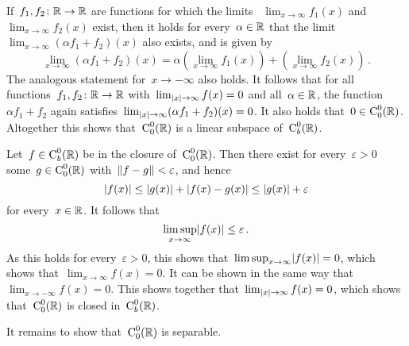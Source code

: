 If~$f_1, f_2 \colon \mathbb{R} \to \mathbb{R}$ are functions for which the limits
~$\lim_{x \to \infty} f_1(x)$ and~$\lim_{x \to \infty} f_2(x)$ exist, then it holds for every~$\alpha \in \mathbb{R}$ that the limit~$\lim_{x \to \infty} (\alpha f_1 + f_2)(x)$ also exists, and is given by
\[
    \lim_{x \to \infty} (\alpha f_1 + f_2)(x)
  =   \alpha \left( \lim_{x \to \infty} f_1(x) \right)
    + \left( \lim_{x \to \infty} f_2(x) \right) \,.
\]
The analogous statement for~$x \to -\infty$ also holds.
It follows that for all functions~$f_1, f_2 \colon \mathbb{R} \to \mathbb{R}$ with~$\lim_{\lvert x\rvert \to \infty} f(x) = 0$ and all~$\alpha \in \mathbb{R}$, the function~$\alpha f_1 + f_2$ again satisfies~$\lim_{\lvert x\rvert \to \infty} (\alpha f_1 + f_2)(x) = 0$.
It also holds that~$0 \in \operatorname{C}^0_0(\mathbb{R})$.
Altogether this shows that~$\operatorname{C}^0_0(\mathbb{R})$ is a linear subspace of~$\operatorname{C}^0_b(\mathbb{R})$.

Let~$f \in \operatorname{C}^0_b(\mathbb{R})$ be in the closure of~$\operatorname{C}^0_0(\mathbb{R})$.
Then there exist for every~$\varepsilon > 0$ some~$g \in \operatorname{C}^0_0(\mathbb{R})$ with~$\lVert f-g\rVert < \varepsilon$, and hence
\[
        \lvert f(x)\rvert
  \leq  \lvert g(x)\rvert + \lvert f(x) - g(x) \rvert
  \leq  \lvert g(x) \rvert + \varepsilon
\]
for every~$x \in \mathbb{R}$.
It follows that
\[
        \limsup_{x \to \infty} \lvert f(x)\rvert
  \leq  \varepsilon \,.
\]
As this holds for every~$\varepsilon > 0$, this shows that~$\limsup_{x \to \infty} \lvert f(x) \rvert = 0$, which shows that~$\lim_{x \to \infty} f(x) = 0$.
It can be shown in the same way that~$\lim_{x \to -\infty} f(x) = 0$.
This shows together that~$\lim_{\lvert x\rvert \to \infty} f(x) = 0$, which shows that~$\operatorname{C}^0_0(\mathbb{R})$ is closed in~$\operatorname{C}^0_b(\mathbb{R})$.

It remains to show that~$\operatorname{C}^0_0(\mathbb{R})$ is separable.









